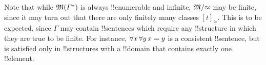 \documentclass[../../../include/open-logic-section]{subfiles}
\begin{document}
\begin{digress}
Note that while $\mathfrak M(\Gamma^*)$ is always !!{enumerable} and
infinite, $\mathfrak M/\mathord\approx$ may be finite, since it may turn out
that there are only finitely many classes $[t]_\approx$.  This is to
be expected, since $\Gamma$ may contain !!{sentence}s which require
any !!{structure} in which they are true to be finite.  For instance,
$\lforall[x][\lforall[y][x = y]]$ is a consistent !!{sentence}, but is
satisfied only in !!{structure}s with a !!{domain} that contains
exactly one !!{element}.
\end{digress}
\end{document}
